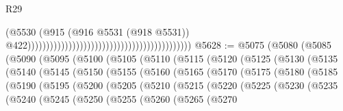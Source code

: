 \begin{lexlean}{R29}
\begin{coremodule}
                                                                                        (@5530
                                                                                          (@915
                                                                                            (@916
                                                                                              @5531
                                                                                              (@918
                                                                                                @5531))
                                                                                            @422))))))))))))))))))))))))))))))))))))))))))))
@5628 := @5075
    (@5080
      (@5085
        (@5090
          (@5095
            (@5100
              (@5105
                (@5110
                  (@5115
                    (@5120
                      (@5125
                        (@5130
                          (@5135
                            (@5140
                              (@5145
                                (@5150
                                  (@5155
                                    (@5160
                                      (@5165
                                        (@5170
                                          (@5175
                                            (@5180
                                              (@5185
                                                (@5190
                                                  (@5195
                                                    (@5200
                                                      (@5205
                                                        (@5210
                                                          (@5215
                                                            (@5220
                                                              (@5225
                                                                (@5230
                                                                  (@5235
                                                                    (@5240
                                                                      (@5245
                                                                        (@5250
                                                                          (@5255
                                                                            (@5260
                                                                              (@5265
                                                                                (@5270

\end{coremodule}
\end{lexlean}
